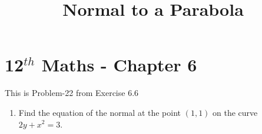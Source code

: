 \documentclass[12pt]{article}
\begin{document}
\begin{center}
	\title{\textbf{Normal to a Parabola}}
\date{\vspace{-5ex}} %
\maketitle
\end{center}
\setcounter{page}{1}

\section{12$^{th}$ Maths - Chapter 6}
This is Problem-22 from Exercise 6.6 
\begin{enumerate}
\item Find the equation of the normal at the point $(1,1)$ on the curve $2y + x^2 = 3$. 


\end{enumerate}
\end{document}
